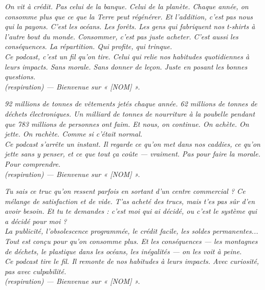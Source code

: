 \documentclass[a4paper,11pt]{article}
\begin{document}
\begin{tcolorbox}[card, title=Option 2 — « Le crédit » (m\'etaphore $\rightarrow$ syst\`eme)]
\textit{On vit à crédit. Pas celui de la banque. Celui de la planète. Chaque année, on consomme plus que ce que la Terre peut régénérer. Et l'addition, c'est pas nous qui la payons. C'est les océans. Les forêts. Les gens qui fabriquent nos t-shirts à l'autre bout du monde. Consommer, c'est pas juste acheter. C'est aussi les conséquences. La répartition. Qui profite, qui trinque.}\\[4pt]
\textit{Ce podcast, c'est un fil qu'on tire. Celui qui relie nos habitudes quotidiennes à leurs impacts. Sans morale. Sans donner de leçon. Juste en posant les bonnes questions.}\\[4pt]
\textit{(respiration) — Bienvenue sur « [NOM] ».}
\end{tcolorbox}

\begin{tcolorbox}[card, title=Option 3 — « L'absurde » (chiffres $\rightarrow$ questionnement)]
\textit{92 millions de tonnes de vêtements jetés chaque année. 62 millions de tonnes de déchets électroniques. Un milliard de tonnes de nourriture à la poubelle pendant que 783 millions de personnes ont faim. Et nous, on continue. On achète. On jette. On rachète. Comme si c'était normal.}\\[4pt]
\textit{Ce podcast s'arrête un instant. Il regarde ce qu'on met dans nos caddies, ce qu'on jette sans y penser, et ce que tout ça coûte — vraiment. Pas pour faire la morale. Pour comprendre.}\\[4pt]
\textit{(respiration) — Bienvenue sur « [NOM] ».}
\end{tcolorbox}

\begin{tcolorbox}[card, title=Option 4 — « Le fil rouge » (narratif{,} personnel)]
\textit{Tu sais ce truc qu'on ressent parfois en sortant d'un centre commercial ? Ce mélange de satisfaction et de vide. T'as acheté des trucs, mais t'es pas sûr d'en avoir besoin. Et tu te demandes : c'est moi qui ai décidé, ou c'est le système qui a décidé pour moi ?}\\[4pt]
\textit{La publicité, l'obsolescence programmée, le crédit facile, les soldes permanentes... Tout est conçu pour qu'on consomme plus. Et les conséquences — les montagnes de déchets, le plastique dans les océans, les inégalités — on les voit à peine.}\\[4pt]
\textit{Ce podcast tire le fil. Il remonte de nos habitudes à leurs impacts. Avec curiosité, pas avec culpabilité.}\\[4pt]
\textit{(respiration) — Bienvenue sur « [NOM] ».}
\end{tcolorbox}
\end{document}
